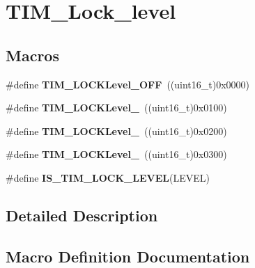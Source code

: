 \hypertarget{group___t_i_m___lock__level}{}\section{T\+I\+M\+\_\+\+Lock\+\_\+level}
\label{group___t_i_m___lock__level}
\subsection*{Macros}
\begin{DoxyCompactItemize}
\item 
\hypertarget{group___t_i_m___lock__level_ga84d318c62d3e5dfe7082610d03e11f2f}{}\#define {\bfseries T\+I\+M\+\_\+\+L\+O\+C\+K\+Level\+\_\+\+O\+F\+F}~((uint16\+\_\+t)0x0000)\label{group___t_i_m___lock__level_ga84d318c62d3e5dfe7082610d03e11f2f}

\item 
\hypertarget{group___t_i_m___lock__level_ga7e4326fc7756ebf5e9eb9776c2734aea}{}\#define {\bfseries T\+I\+M\+\_\+\+L\+O\+C\+K\+Level\+\_}~((uint16\+\_\+t)0x0100)\label{group___t_i_m___lock__level_ga7e4326fc7756ebf5e9eb9776c2734aea}

\item 
\hypertarget{group___t_i_m___lock__level_ga91bdf218f766e6a10b7a7df407250d25}{}\#define {\bfseries T\+I\+M\+\_\+\+L\+O\+C\+K\+Level\+\_}~((uint16\+\_\+t)0x0200)\label{group___t_i_m___lock__level_ga91bdf218f766e6a10b7a7df407250d25}

\item 
\hypertarget{group___t_i_m___lock__level_gaa0a0c1ffd9dc582d6571780c1747920b}{}\#define {\bfseries T\+I\+M\+\_\+\+L\+O\+C\+K\+Level\+\_}~((uint16\+\_\+t)0x0300)\label{group___t_i_m___lock__level_gaa0a0c1ffd9dc582d6571780c1747920b}

\item 
\#define {\bfseries I\+S\+\_\+\+T\+I\+M\+\_\+\+L\+O\+C\+K\+\_\+\+L\+E\+V\+E\+L}(L\+E\+V\+E\+L)
\end{DoxyCompactItemize}


\subsection{Detailed Description}


\subsection{Macro Definition Documentation}
\hypertarget{group___t_i_m___lock__level_gacf5e70717f6d13af301331bb043f5d48}{}

